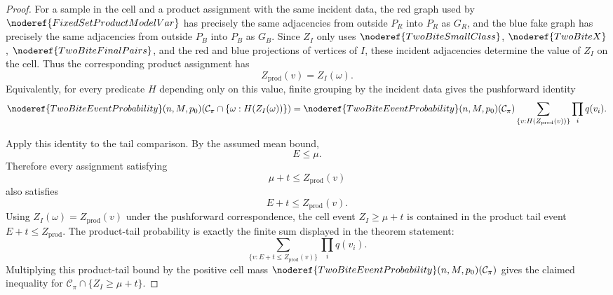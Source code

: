 \begin{proof}
For a sample in the cell and a product assignment with the same incident data,
the red graph used by \(\noderef{FixedSetProductModelVar}\) has precisely the
same adjacencies from outside \(P_R\) into \(P_R\) as \(G_R\), and the blue
fake graph has precisely the same adjacencies from outside \(P_B\) into
\(P_B\) as \(G_B\).  Since \(Z_I\) only uses
\(\noderef{TwoBiteSmallClass}\), \(\noderef{TwoBiteX}\),
\(\noderef{TwoBiteFinalPairs}\), and the red and blue projections of vertices
of \(I\), these incident adjacencies determine the value of \(Z_I\) on the
cell.  Thus the corresponding product assignment has
\[
Z_{\mathrm{prod}}(v)=Z_I(\omega).
\]
Equivalently, for every predicate \(H\) depending only on this value, finite
grouping by the incident data gives the pushforward identity
\[
\noderef{TwoBiteEventProbability}(n,M,p_0)
  (\mathcal C_\pi\cap\{\omega:H(Z_I(\omega))\})
=
\noderef{TwoBiteEventProbability}(n,M,p_0)(\mathcal C_\pi)
  \sum_{\{v:H(Z_{\mathrm{prod}}(v))\}}\prod_iq(v_i).
\]

Apply this identity to the tail comparison.  By the assumed mean bound,
\[
E\le\mu.
\]
Therefore every assignment satisfying
\[
\mu+t\le Z_{\mathrm{prod}}(v)
\]
also satisfies
\[
E+t\le Z_{\mathrm{prod}}(v).
\]
Using \(Z_I(\omega)=Z_{\mathrm{prod}}(v)\) under the pushforward
correspondence, the cell event \(Z_I\ge\mu+t\) is contained in the product
tail event \(E+t\le Z_{\mathrm{prod}}\).  The product-tail probability is
exactly the finite sum displayed in the theorem statement:
\[
\sum_{\{v:E+t\le Z_{\mathrm{prod}}(v)\}}\prod_iq(v_i).
\]
Multiplying this product-tail bound by the positive cell mass
\(\noderef{TwoBiteEventProbability}(n,M,p_0)(\mathcal C_\pi)\) gives the
claimed inequality for
\(\mathcal C_\pi\cap\{Z_I\ge\mu+t\}\).
\end{proof}

